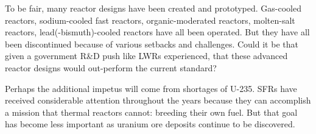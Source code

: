 To be fair, many reactor designs have been created and prototyped. Gas-cooled reactors, sodium-cooled fast reactors, organic-moderated reactors, molten-salt reactors, lead(-bismuth)-cooled reactors have all been operated. But they have all been discontinued because of various setbacks and challenges. Could it be that given a government R\&D push like LWRs experienced, that these advanced reactor designs would out-perform the current standard?

Perhaps the additional impetus will come from shortages of U-235. SFRs have received considerable attention throughout the years because they can accomplish a mission that thermal reactors cannot: breeding their own fuel.
But that goal has become less important as uranium ore deposits continue to be discovered.



\begingroup
\let\cleardoublepage\clearpage




\endgroup